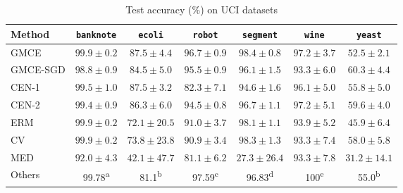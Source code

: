 \documentclass{llncs}
\begin{document}
		\begin{table}[t]
			\caption{Test accuracy (\%) on UCI datasets}
			\label{tab:uci_experiments}
			\centering
			\begin{tabular}{lcccccc}	
				Method         & \texttt{banknote}       & \texttt{ecoli}          & \texttt{robot}          & \texttt{segment}        & \texttt{wine}           & \texttt{yeast}          \\
				\midrule
				G\gls{MCE}     & $\mathbf{99.9 \pm 0.2}$ & $\mathbf{87.5 \pm 4.4}$ & $\mathbf{96.7 \pm 0.9}$ & $\mathbf{98.4 \pm 0.8}$ & $\mathbf{97.2 \pm 3.7}$ & $52.5 \pm 2.1$          \\
				G\gls{MCE}-SGD & $98.8 \pm 0.9$          & $84.5 \pm 5.0$          & $95.5 \pm 0.9$          & $96.1 \pm 1.5$          & $93.3 \pm 6.0$          & $\mathbf{60.3 \pm 4.4}$ \\
				\gls{CEN}-1    & $99.5 \pm 1.0$          & $\mathbf{87.5 \pm 3.2}$ & $82.3 \pm 7.1$          & $94.6 \pm 1.6$          & $96.1 \pm 5.0$          & $55.8 \pm 5.0$          \\
				\gls{CEN}-2    & $99.4 \pm 0.9$          & $86.3 \pm 6.0$          & $94.5 \pm 0.8$          & $96.7 \pm 1.1$          & $97.2 \pm 5.1$          & $59.6 \pm 4.0$          \\
				ERM            & $\mathbf{99.9 \pm 0.2}$ & $72.1 \pm 20.5$         & $91.0 \pm 3.7$          & $98.1 \pm 1.1$          & $93.9 \pm 5.2$          & $45.9 \pm 6.4$          \\
				CV             & $\mathbf{99.9 \pm 0.2}$ & $73.8 \pm 23.8$         & $90.9 \pm 3.4$          & $98.3 \pm 1.3$          & $93.3 \pm 7.4$          & $58.0 \pm 5.8$          \\
				MED            & $92.0 \pm 4.3$          & $42.1 \pm 47.7$         & $81.1 \pm 6.2$          & $27.3 \pm 26.4$         & $93.3 \pm 7.8$          & $31.2 \pm 14.1$         \\
				Others         & 99.78\textsuperscript{a}& 81.1\textsuperscript{b} & 97.59\textsuperscript{c}& 96.83\textsuperscript{d}& 100\textsuperscript{e}  & 55.0\textsuperscript{b}
				

\end{tabular}
\end{table}
\end{document}
